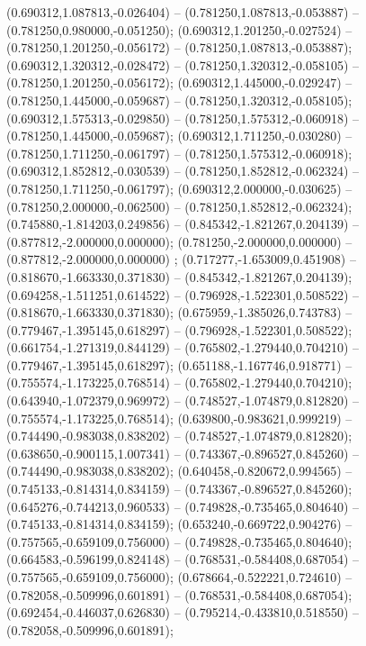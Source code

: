  (0.690312,1.087813,-0.026404) -- (0.781250,1.087813,-0.053887) -- (0.781250,0.980000,-0.051250);
 (0.690312,1.201250,-0.027524) -- (0.781250,1.201250,-0.056172) -- (0.781250,1.087813,-0.053887);
 (0.690312,1.320312,-0.028472) -- (0.781250,1.320312,-0.058105) -- (0.781250,1.201250,-0.056172);
 (0.690312,1.445000,-0.029247) -- (0.781250,1.445000,-0.059687) -- (0.781250,1.320312,-0.058105);
 (0.690312,1.575313,-0.029850) -- (0.781250,1.575312,-0.060918) -- (0.781250,1.445000,-0.059687);
 (0.690312,1.711250,-0.030280) -- (0.781250,1.711250,-0.061797) -- (0.781250,1.575312,-0.060918);
 (0.690312,1.852812,-0.030539) -- (0.781250,1.852812,-0.062324) -- (0.781250,1.711250,-0.061797);
 (0.690312,2.000000,-0.030625) -- (0.781250,2.000000,-0.062500) -- (0.781250,1.852812,-0.062324);
 (0.745880,-1.814203,0.249856) -- (0.845342,-1.821267,0.204139) -- (0.877812,-2.000000,0.000000);
 (0.781250,-2.000000,0.000000) -- (0.877812,-2.000000,0.000000) ;
 (0.717277,-1.653009,0.451908) -- (0.818670,-1.663330,0.371830) -- (0.845342,-1.821267,0.204139);
 (0.694258,-1.511251,0.614522) -- (0.796928,-1.522301,0.508522) -- (0.818670,-1.663330,0.371830);
 (0.675959,-1.385026,0.743783) -- (0.779467,-1.395145,0.618297) -- (0.796928,-1.522301,0.508522);
 (0.661754,-1.271319,0.844129) -- (0.765802,-1.279440,0.704210) -- (0.779467,-1.395145,0.618297);
 (0.651188,-1.167746,0.918771) -- (0.755574,-1.173225,0.768514) -- (0.765802,-1.279440,0.704210);
 (0.643940,-1.072379,0.969972) -- (0.748527,-1.074879,0.812820) -- (0.755574,-1.173225,0.768514);
 (0.639800,-0.983621,0.999219) -- (0.744490,-0.983038,0.838202) -- (0.748527,-1.074879,0.812820);
 (0.638650,-0.900115,1.007341) -- (0.743367,-0.896527,0.845260) -- (0.744490,-0.983038,0.838202);
 (0.640458,-0.820672,0.994565) -- (0.745133,-0.814314,0.834159) -- (0.743367,-0.896527,0.845260);
 (0.645276,-0.744213,0.960533) -- (0.749828,-0.735465,0.804640) -- (0.745133,-0.814314,0.834159);
 (0.653240,-0.669722,0.904276) -- (0.757565,-0.659109,0.756000) -- (0.749828,-0.735465,0.804640);
 (0.664583,-0.596199,0.824148) -- (0.768531,-0.584408,0.687054) -- (0.757565,-0.659109,0.756000);
 (0.678664,-0.522221,0.724610) -- (0.782058,-0.509996,0.601891) -- (0.768531,-0.584408,0.687054);
 (0.692454,-0.446037,0.626830) -- (0.795214,-0.433810,0.518550) -- (0.782058,-0.509996,0.601891);
